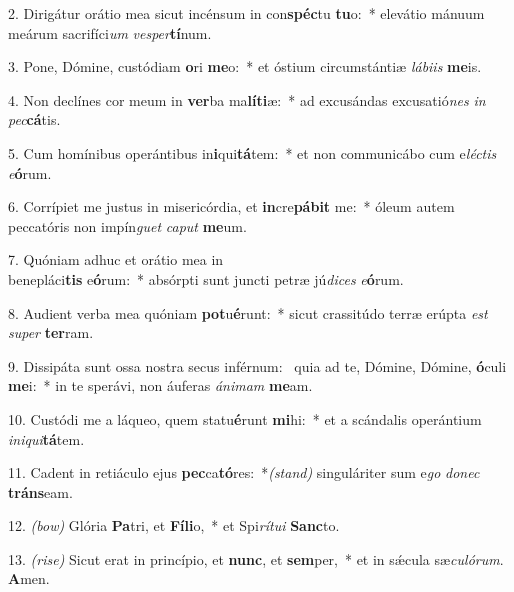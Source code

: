 2. Dirigátur orátio mea sicut incénsum in con\textbf{spéc}tu \textbf{tu}o:~* elevátio mánuum meárum sacrifíci\textit{um} \textit{ves}\textit{per}\textbf{tí}num.

3. Pone, Dómine, custódiam \textbf{o}ri \textbf{me}o:~* et óstium circumstántiæ \textit{lá}\textit{bi}\textit{is} \textbf{me}is.

4. Non declínes cor meum in \textbf{ver}ba ma\textbf{lí}\textbf{ti}æ:~* ad excusándas excusatió\textit{nes} \textit{in} \textit{pec}\textbf{cá}tis.

5. Cum homínibus operántibus in\textbf{i}qui\textbf{tá}tem:~* et non communicábo cum e\textit{léc}\textit{tis} \textit{e}\textbf{ó}rum.

6. Corrípiet me justus in misericórdia, et \textbf{in}cre\textbf{pá}\textbf{bit} me:~* óleum autem peccatóris non impín\textit{guet} \textit{ca}\textit{put} \textbf{me}um.

7. Quóniam adhuc et orátio mea in\\ benepláci\textbf{tis} e\textbf{ó}rum:~* absórpti sunt juncti petræ jú\textit{di}\textit{ces} \textit{e}\textbf{ó}rum.

8. Audient verba mea quóniam \textbf{pot}u\textbf{é}runt:~* sicut crassitúdo terræ erúpta \textit{est} \textit{su}\textit{per} \textbf{ter}ram.

9. Dissipáta sunt ossa nostra secus inférnum:~{\color{red}\GreDagger} quia ad te, Dómine, Dómine, \textbf{ó}culi \textbf{me}i:~* in te sperávi, non áuferas \textit{á}\textit{ni}\textit{mam} \textbf{me}am.

10. Custódi me a láqueo, quem statu\textbf{é}runt \textbf{mi}hi:~* et a scándalis operántium \textit{in}\textit{i}\textit{qui}\textbf{tá}tem.

11. Cadent in retiáculo ejus \textbf{pec}ca\textbf{tó}res:~*{\color{red}\textit{(stand)}} singuláriter sum e\textit{go} \textit{do}\textit{nec} \textbf{tráns}eam.

12. {\color{red}\textit{(bow)}} Glória \textbf{Pa}tri, et \textbf{Fí}\textbf{li}o,~* et Spi\textit{rí}\textit{tu}\textit{i} \textbf{Sanc}to.

13. {\color{red}\textit{(rise)}} Sicut erat in princípio, et \textbf{nunc}, et \textbf{sem}per,~* et in s\'{\ae}cula sæ\textit{cu}\textit{ló}\textit{rum}. \textbf{A}men.